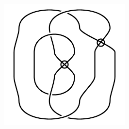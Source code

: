 \begin{figure}[H]
\begin{minipage}[b]{.18\linewidth}
\end{minipage}
\begin{minipage}[b]{.18\linewidth}
\centering
\includegraphics[width=\linewidth]{../data/virtual_4_1.png}
\end{minipage}
\end{figure}

